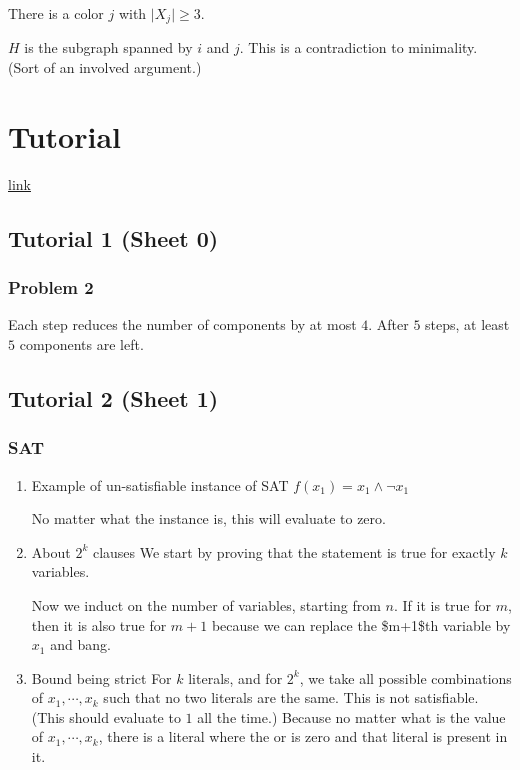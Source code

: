 \documentclass[11pt]{article}
\begin{document}
There is a color \(j\) with \(\vert X_j \vert \ge 3\).

\(H\) is the subgraph spanned by \(i\) and \(j\). This is a contradiction to
minimality. (Sort of an involved argument.)
\section{Tutorial}
\label{sec:org67ccf37}
\href{http://discretemath.imp.fu-berlin.de/DMII-2018-19/}{link}
\subsection{Tutorial 1 (Sheet 0)}
\label{sec:orgf7493a8}
\subsubsection{Problem 2}
\label{sec:org9658d0a}
Each step reduces the number of components by at most \(4\). After \(5\) steps, at least \(5\) components are left. 
\subsection{Tutorial 2 (Sheet 1)}
\label{sec:org01c4ad1}
\subsubsection{SAT}
\label{sec:org0ce3d1d}
\begin{enumerate}
\item Example of un-satisfiable instance of SAT
\label{sec:org7419d49}
\(f(x_1) = x_1 \wedge \neg x_1\)

No matter what the instance is, this will evaluate to zero. 
\item About \(2^k\) clauses
\label{sec:org0be419e}
We start by proving that the statement is true for exactly \(k\) variables. 

Now we induct on the number of variables, starting from \(n\). If it is true
for \(m\), then it is also true for \(m+1\) because we can replace the \$m+1\$th
variable by \(x_1\) and bang.
\item Bound being strict
\label{sec:org874885e}
For \(k\) literals, and for \(2^k\), we take all possible combinations of \(x_1,
     \cdots, x_k\) such that no two literals are the same. This is not
satisfiable. (This should evaluate to \(1\) all the time.) Because no matter
what is the value of \(x_1, \cdots, x_k\), there is a literal where the or is
zero and that literal is present in it.
\end{enumerate}
\end{document}

